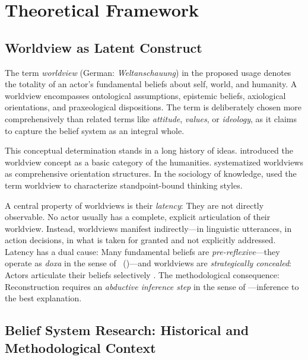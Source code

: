 \documentclass[11pt,a4paper]{article}
\theoremstyle{definition}
\theoremstyle{plain}
\theoremstyle{remark}
\begin{document}

\section{Theoretical Framework}
\label{sec:theory}

\subsection{Worldview as Latent Construct}
\label{sec:worldview}

The term \emph{worldview} (German: \emph{Weltanschauung}) in the proposed usage denotes the totality of an actor's fundamental beliefs about self, world, and humanity. A worldview encompasses ontological assumptions, epistemic beliefs, axiological orientations, and praxeological dispositions. The term is deliberately chosen more comprehensively than related terms like \emph{attitude}, \emph{values}, or \emph{ideology}, as it claims to capture the belief system as an integral whole.

This conceptual determination stands in a long history of ideas. \citet{Dilthey1911} introduced the worldview concept as a basic category of the humanities. \citet{Jaspers1919} systematized worldviews as comprehensive orientation structures. In the sociology of knowledge, \citet{Mannheim1929} used the term worldview to characterize standpoint-bound thinking styles.

A central property of worldviews is their \emph{latency}: They are not directly observable. No actor usually has a complete, explicit articulation of their worldview. Instead, worldviews manifest indirectly---in linguistic utterances, in action decisions, in what is taken for granted and not explicitly addressed. Latency has a dual cause: Many fundamental beliefs are \emph{pre-reflexive}---they operate as \emph{doxa} in the sense of \citeauthor{Bourdieu1977}~(\citeyear{Bourdieu1977})---and worldviews are \emph{strategically concealed}: Actors articulate their beliefs selectively \citep{Goffman1959}. The methodological consequence: Reconstruction requires an \emph{abductive inference step} in the sense of \citet{Peirce1903}---inference to the best explanation.

\subsection{Belief System Research: Historical and Methodological Context}
\end{document}
